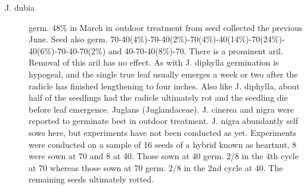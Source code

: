 \begin{description}
\item[J. dubia] germ. 48\% in March in outdoor treatment from seed collected the
previous June. Seed also germ. 70-40(4\%)-70-40(2\%)-70(4\%)-40(14\%)-70(24\%)-
40(6\%)-70-40-70(2\%) and 40-70-40(8\%)-70. There is a prominent aril. Removal of
this aril has no effect. As with J. diphylla germination is hypogeal, and the single true
leaf usually emerges a week or two after the radicle has finished lengthening to four
inches. Also like J. diphylla, about half of the seedlings had the radicle ultimately rot
and the seedling die before leaf emergence.
Juglans (Juglandaceae). J. cinerea and nigra were reported to germinate
best in outdoor treatment. J. nigra abundantly self sows here, but experiments have
not been conducted as yet. Experiments were conducted on a sample of 16 seeds of
a hybrid known as heartnut, 8 were sown at 70 and 8 at 40. Those sown at 40 germ.
2/8 in the 4th cycle at 70 whereas those sown at 70 germ. 2/8 in the 2nd cycle at 40.
The remaining seeds ultimately rotted.


\end{description}
